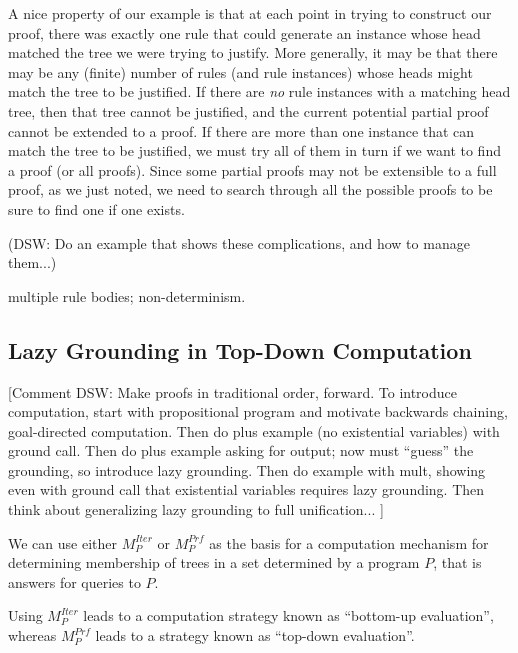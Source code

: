 A nice property of our example is that at each point in trying to
construct our proof, there was exactly one rule that could generate an
instance whose head matched the tree we were trying to justify.  More
generally, it may be that there may be any (finite) number of rules
(and rule instances) whose heads might match the tree to be
justified.  If there are {\em no} rule instances with a matching head
tree, then that tree cannot be justified, and the current potential
partial proof cannot be extended to a proof.  If there are more than
one instance that can match the tree to be justified, we must try all
of them in turn if we want to find a proof (or all proofs).  Since
some partial proofs may not be extensible to a full proof, as we just
noted, we need to search through all the possible proofs to be sure to
find one if one exists.

(DSW: Do an example that shows these complications, and how to manage them...)


multiple rule bodies; non-determinism.



\subsection{Lazy Grounding in Top-Down Computation}

[Comment DSW: Make proofs in traditional order, forward.  To introduce
  computation, start with propositional program and motivate backwards
  chaining, goal-directed computation.  Then do plus example (no
  existential variables) with ground call.  Then do plus example
  asking for output; now must ``guess'' the grounding, so introduce
  lazy grounding.  Then do example with mult, showing even with ground
  call that existential variables requires lazy grounding.
  Then think about generalizing lazy grounding to full unification...
  ]



We can use either $M_P^{Iter}$ or $M_P^{Prf}$ as the basis for a
computation mechanism for determining membership of trees in a set
determined by a program $P$, that is answers for queries to $P$.

Using $M_P^{Iter}$ leads to a computation strategy known as
``bottom-up evaluation'', whereas $M_P^{Prf}$ leads to a strategy
known as ``top-down evaluation''.

